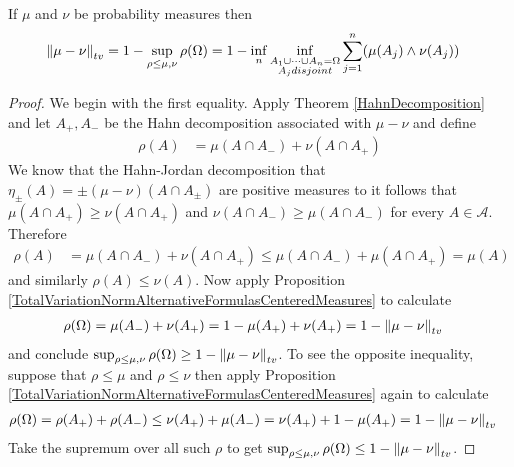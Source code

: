 \begin{prop}If $\mu$  and $\nu$ be probability measures then 
\begin{align*}
\left \lVert  \mu - \nu \right \rVert_{tv} &= 1 - \sup_{\rho \leq \mu, \nu} \rho(\Omega) = 1 - \inf_n \inf_{\substack{A_1 \cup \dotsb \cup A_n = \Omega \\ \text{$A_j$} disjoint}} \sum_{j=1}^n (\mu(A_j) \wedge \nu(A_j))
\end{align*}
\end{prop}
\begin{proof}
We begin with the first equality.  Apply Theorem \ref{HahnDecomposition} and let $A_+, A_-$ be the Hahn decomposition associated with $\mu - \nu$ and define
\begin{align*}
\rho(A) &= \mu(A \cap A_-) + \nu(A \cap A_+)
\end{align*}
We know that the Hahn-Jordan decomposition that $\eta_\pm(A) = \pm (\mu - \nu)(A \cap A_\pm)$ are positive measures to it follows that $\mu(A \cap A_+) \geq \nu(A \cap A_+)$ and 
$\nu(A \cap A_-) \geq \mu(A \cap A_-)$ for every $A \in \mathcal{A}$.  Therefore
\begin{align*}
\rho(A) &= \mu(A \cap A_-) + \nu(A \cap A_+) \leq \mu(A \cap A_-) + \mu(A \cap A_+)  = \mu(A)
\end{align*}
and similarly $\rho(A) \leq \nu(A)$.  Now apply Proposition \ref{TotalVariationNormAlternativeFormulasCenteredMeasures} to calculate
\begin{align*}
\rho(\Omega) &= \mu(A_-) + \nu(A_+) = 1 - \mu(A_+) + \nu(A_+) = 1 - \left \lVert  \mu - \nu \right \rVert_{tv}
\end{align*}
and conclude $\sup_{\rho \leq \mu, \nu} \rho(\Omega) \geq 1 - \left \lVert  \mu - \nu \right \rVert_{tv}$.  To see the opposite inequality, suppose that $\rho \leq \mu$ and $\rho \leq \nu$ then
apply Proposition \ref{TotalVariationNormAlternativeFormulasCenteredMeasures} again to calculate
\begin{align*}
\rho(\Omega) &= \rho(A_+) + \rho(A_-) \leq \nu(A_+) + \mu(A_-) = \nu(A_+) + 1 - \mu(A_+) = 1 - \left \lVert  \mu - \nu \right \rVert_{tv}
\end{align*}
Take the supremum over all such $\rho$ to get $\sup_{\rho \leq \mu, \nu} \rho(\Omega) \leq 1 - \left \lVert  \mu - \nu \right \rVert_{tv}$. 


\end{proof}
